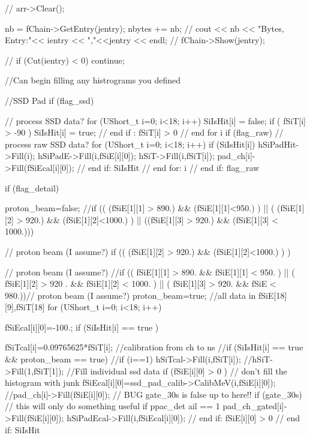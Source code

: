 \begin{DoxyCode}
{      //      arr->Clear(); 


      nb = fChain->GetEntry(jentry);   nbytes += nb;
      //      cout << nb << "Bytes, Entry:"<< ientry << ","<<jentry << endl;
      //      fChain->Show(jentry);


      // if (Cut(ientry) < 0) continue;
        
      //Can begin filling any histrograms you defined
      
      //SSD Pad
      if (flag_ssd) { // process SSD data?
        for (UShort_t i=0; i<18; i++) {
          SiIsHit[i] = false;
          if ( fSiT[i] > -90 ) {
            SiIsHit[i] = true;
          } // end if : fSiT[i] > 0
        } // end for i
        if (flag_raw) { // process raw SSD data?
          for (UShort_t i=0; i<18; i++) {
            if (SiIsHit[i]) {
              hSiPadHit->Fill(i);       
              hSiPadE->Fill(i,fSiE[i][0]);
              hSiT->Fill(i,fSiT[i]);
              pad_ch[i]->Fill(fSiEcal[i][0]);
            } // end if: SiIsHit
          } // end for: i
        } // end if: flag_raw
        
        if (flag_detail){
          proton_beam=false;
          //if  (( (fSiE[1][1] > 890.) && (fSiE[1][1]<950.) ) || ( (fSiE[1][2] > 
      920.) && (fSiE[1][2]<1000.)  ) || ((fSiE[1][3] > 920.) && (fSiE[1][3] < 1000.))){
      // proton beam (I assume?)
          if  (( (fSiE[1][2] > 920.) && (fSiE[1][2]<1000.) ) ){// proton beam (I 
      assume?)
          //if  (( fSiE[1][1] > 890. && fSiE[1][1] < 950. ) || ( fSiE[1][2] > 920
      . && fSiE[1][2] < 1000. ) || ( fSiE[1][3] > 920. && fSiE < 980.)){// proton beam 
      (I assume?)
            proton_beam=true;
          }
          //all data in fSiE[18][9],fSiT[18]
          for (UShort_t i=0; i<18; i++) {
            fSiEcal[i][0]=-100.;
            if (SiIsHit[i] == true ){
              fSiTcal[i]=0.09765625*fSiT[i]; //calibration from ch to ns
            //if (SiIsHit[i] == true && proton_beam == true){
              //if (i==1)
              hSiTcal->Fill(i,fSiT[i]);
              //hSiT->Fill(1,fSiT[1]);
              //Fill individual ssd data 
              if (fSiE[i][0] > 0 ){ // don't fill the histogram with junk
                fSiEcal[i][0]=ssd_pad_calib->CalibMeV(i,fSiE[i][0]);
                //pad_ch[i]->Fill(fSiE[i][0]);
                // BUG gate_30s is false up to here!!
                if (gate_30s) { // this will only do something useful if ppac_det
      ail == 1
                   pad_ch_gated[i]->Fill(fSiE[i][0]);
                }
                hSiPadEcal->Fill(i,fSiEcal[i][0]);      
              } // end if: fSiE[i][0] > 0
            } // end if: SiIsHit

}}}}}}}
\end{DoxyCode}
